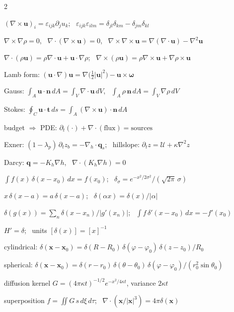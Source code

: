 \documentclass[11pt,letterpaper]{article}
\numberwithin{equation}{section}
\newcommand{\uu}{\mathbf{u}}
\newcommand{\xx}{\mathbf{x}}
\newcommand{\nn}{\mathbf{n}}
\newcommand{\qq}{\mathbf{q}}
\newcommand{\tv}{\mathbf{t}}
\newcommand{\bomega}{\bm{\omega}}
\newcommand{\Up}{\mathcal{U}}
\begin{document}
\begin{multicols}{2}
\begin{fsl}
  \item $(\nabla\times\uu)_i=\varepsilon_{ijk}\partial_ju_k$; \ $\varepsilon_{ijk}\varepsilon_{ilm}=\delta_{jl}\delta_{km}-\delta_{jm}\delta_{kl}$
  \item $\nabla\times\nabla\rho=0$, \ $\nabla\cdot(\nabla\times\uu)=0$, \ $\nabla\times\nabla\times\uu=\nabla(\nabla\cdot\uu)-\nabla^2\uu$
  \item $\nabla\cdot(\rho\uu)=\rho\nabla\cdot\uu+\uu\cdot\nabla\rho$; \ $\nabla\times(\rho\uu)=\rho\nabla\times\uu+\nabla\rho\times\uu$
  \item Lamb form: $(\uu\cdot\nabla)\uu=\nabla\big(\frac12|\uu|^2\big)-\uu\times\bomega$
  \item Gauss: $\int_A\uu\cdot\nn\,dA=\int_V\nabla\cdot\uu\,dV$, \ $\int_A\rho\,\nn\,dA=\int_V\nabla\rho\,dV$
  \item Stokes: $\oint_C\uu\cdot\tv\,ds=\int_A(\nabla\times\uu)\cdot\nn\,dA$
  \item budget $\Rightarrow$ PDE: $\partial_t(\cdot)+\nabla\cdot(\text{flux})=\text{sources}$
  \item Exner: $(1-\lambda_p)\,\partial_tz_b=-\nabla_h\cdot\qq_s$; \ hillslope: $\partial_tz=\Up+\kappa\nabla^2z$
  \item Darcy: $\qq=-K_h\nabla h$, \ $\nabla\cdot(K_h\nabla h)=0$
\end{fsl}

\begin{fsl}
  \item $\int f(x)\,\delta(x-x_0)\,dx=f(x_0)$; \ $\delta_\sigma=e^{-x^2/2\sigma^2}/(\sqrt{2\pi}\,\sigma)$
  \item $x\,\delta(x-a)=a\,\delta(x-a)$; \ $\delta(\alpha x)=\delta(x)/|\alpha|$
  \item $\delta(g(x))=\sum_n\delta(x-x_n)/|g'(x_n)|$; \ $\int f\,\delta'(x-x_0)\,dx=-f'(x_0)$
  \item $H'=\delta$; \ units $[\delta(x)]=[x]^{-1}$
  \item cylindrical: $\delta(\xx-\xx_0)=\delta(R-R_0)\,\delta(\varphi-\varphi_0)\,\delta(z-z_0)/R_0$
  \item spherical: $\delta(\xx-\xx_0)=\delta(r-r_0)\,\delta(\theta-\theta_0)\,\delta(\varphi-\varphi_0)/(r_0^2\sin\theta_0)$
  \item diffusion kernel $G=(4\pi\kappa t)^{-1/2}e^{-x^2/4\kappa t}$, variance $2\kappa t$
  \item superposition $f=\iint G\,s\,d\xi\,d\tau$; \ $\nabla\cdot(\xx/|\xx|^3)=4\pi\delta(\xx)$
\end{fsl}


\end{multicols}
\end{document}
